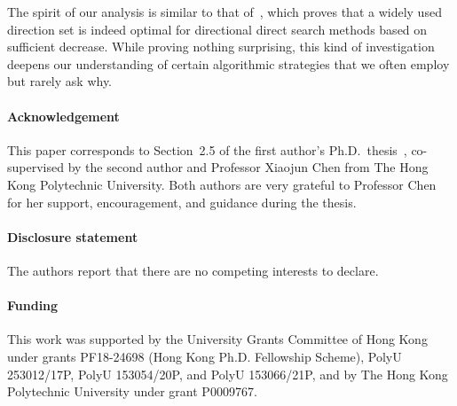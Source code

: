 \documentclass{article}
\numberwithin{equation}{section}
\theoremstyle{definition}
\theoremstyle{plain}
\theoremstyle{remark}
\begin{document}
The spirit of our analysis is similar to that of~\cite{Dodangeh_Vicente_Zhang_2016}, which proves that a widely used direction set is indeed optimal for directional direct search methods
based on sufficient decrease. While proving nothing surprising, this kind of investigation deepens our understanding of certain algorithmic strategies that we often employ but rarely ask why.

\paragraph*{Acknowledgement}
This paper corresponds to Section~2.5 of the first author's Ph.D.~thesis~\cite{Ragonneau_2022}, co-supervised by the second author and Professor Xiaojun Chen from The Hong Kong Polytechnic University.
Both authors are very grateful to Professor Chen for her support, encouragement, and guidance during the thesis.

\paragraph*{Disclosure statement}
The authors report that there are no competing interests to declare.

\paragraph*{Funding}
This work was supported by the University Grants Committee of Hong Kong under grants PF18-24698 (Hong Kong Ph.D. Fellowship Scheme), PolyU 253012/17P, PolyU 153054/20P, and PolyU 153066/21P, and by The Hong Kong Polytechnic University under grant P0009767.



\end{document}
